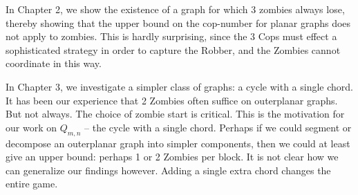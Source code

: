 In Chapter 2, we show the existence of a graph for which 3 zombies always lose,
thereby showing that the upper bound on the cop-number for planar graphs does not
apply to zombies. This is hardly surprising, since the 3 Cops must effect a sophisticated
strategy in order to capture the Robber, and the Zombies cannot coordinate in this way.

In Chapter 3, we investigate a simpler class of graphs: a cycle with a single chord.
It has been our experience that 2 Zombies often suffice on outerplanar graphs. But
not always. The choice of zombie start is critical. This is the
motivation for our work on $Q_{m,n}$ -- the cycle with a single chord. Perhaps if we
could segment or decompose an outerplanar graph into simpler components, then we could at least give an upper bound: perhaps 1 or 2 Zombies per block. It is not clear how we can
generalize our findings however. Adding a single extra chord changes the entire game.
